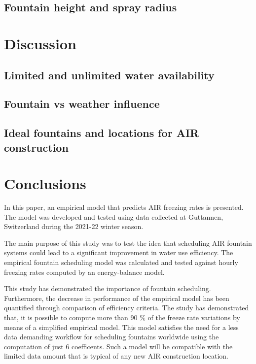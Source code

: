 \documentclass[utf8]{frontiersSCNS}
\begin{document}
\subsection{Fountain height and spray radius}


\section{Discussion}

\subsection{Limited and unlimited water availability}

\subsection{Fountain vs weather influence}

\subsection{Ideal fountains and locations for AIR construction}

\section{Conclusions}
In this paper, an empirical model that predicts AIR freezing rates is presented. The model was developed and
tested using data collected at Guttannen, Switzerland during the 2021-22 winter season. 

The main purpose of this study was to test the idea that scheduling AIR fountain systems could lead to a
significant improvement in water use efficiency. The empirical fountain scheduling model was calculated and
tested against hourly freezing rates computed by an energy-balance model. 

This study has demonstrated the importance of fountain scheduling. Furthermore, the decrease in performance of
the empirical model has been quantified through comparison of efficiency criteria. The study has demonstrated
that, it is possible to compute more than 90 \% of the freeze rate variations by means of a simplified empirical
model. This model satisfies the need for a less data demanding workflow for scheduling fountains worldwide using
the computation of just 6 coefficents. Such a model will be compatible with the limited data amount that is
typical of any new AIR construction location.
\end{document}

